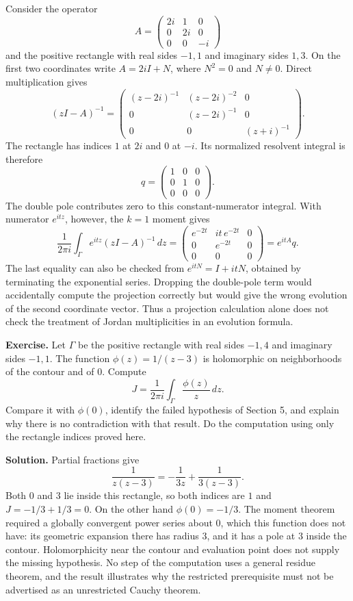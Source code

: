 \documentclass[
  11pt,
]{article}
\begin{document}
Consider the operator \[
A=\begin{pmatrix}2i&1&0\\0&2i&0\\0&0&-i\end{pmatrix}
\] and the positive rectangle with real sides \(-1,1\) and imaginary
sides \(1,3\). On the first two coordinates write \(A=2iI+N\), where
\(N^2=0\) and \(N\ne0\). Direct multiplication gives \[
(zI-A)^{-1}=
\begin{pmatrix}
(z-2i)^{-1}&(z-2i)^{-2}&0\\
0&(z-2i)^{-1}&0\\
0&0&(z+i)^{-1}
\end{pmatrix}.
\] The rectangle has indices \(1\) at \(2i\) and \(0\) at \(-i\). Its
normalized resolvent integral is therefore \[
q=\begin{pmatrix}1&0&0\\0&1&0\\0&0&0\end{pmatrix}.
\] The double pole contributes zero to this constant-numerator integral.
With numerator \(e^{itz}\), however, the \(k=1\) moment gives \[
\frac{1}{2\pi i}\int_\Gamma e^{itz}(zI-A)^{-1}\,dz
=\begin{pmatrix}e^{-2t}&it\,e^{-2t}&0\\0&e^{-2t}&0\\0&0&0\end{pmatrix}
=e^{itA}q.
\] The last equality can also be checked from \(e^{itN}=I+itN\),
obtained by terminating the exponential series. Dropping the double-pole
term would accidentally compute the projection correctly but would give
the wrong evolution of the second coordinate vector. Thus a projection
calculation alone does not check the treatment of Jordan multiplicities
in an evolution formula.

\textbf{Exercise.} Let \(\Gamma\) be the positive rectangle with real
sides \(-1,4\) and imaginary sides \(-1,1\). The function
\(\phi(z)=1/(z-3)\) is holomorphic on neighborhoods of the contour and
of \(0\). Compute \[
J=\frac{1}{2\pi i}\int_\Gamma\frac{\phi(z)}z\,dz.
\] Compare it with \(\phi(0)\), identify the failed hypothesis of
Section 5, and explain why there is no contradiction with that result.
Do the computation using only the rectangle indices proved here.

\textbf{Solution.} Partial fractions give \[
\frac{1}{z(z-3)}=-\frac{1}{3z}+\frac{1}{3(z-3)}.
\] Both \(0\) and \(3\) lie inside this rectangle, so both indices are
\(1\) and \(J=-1/3+1/3=0\). On the other hand \(\phi(0)=-1/3\). The
moment theorem required a globally convergent power series about \(0\),
which this function does not have: its geometric expansion there has
radius \(3\), and it has a pole at \(3\) inside the contour.
Holomorphicity near the contour and evaluation point does not supply the
missing hypothesis. No step of the computation uses a general residue
theorem, and the result illustrates why the restricted prerequisite must
not be advertised as an unrestricted Cauchy theorem.
\end{document}
